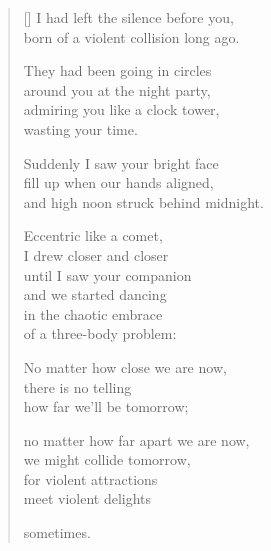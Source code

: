 \documentclass[12pt,a4paper]{article}
\begin{document}
\thispagestyle{empty}


\settowidth{\versewidth}{born of a violent collision long ago.}

\bigskip

\begin{verse}[\versewidth]
I had left the silence before you, \\
born of a violent collision long ago.

They had been going in circles \\
around you at the night party, \\
admiring you like a clock tower, \\
wasting your time.

Suddenly I saw your bright face \\
fill up when our hands aligned, \\
and high noon struck behind midnight.

Eccentric like a comet, \\
I drew closer and closer \\
until I saw your companion \\
and we started dancing \\
in the chaotic embrace \\
of a three-body problem:

No matter how close we are now, \\
there is no telling \\
how far we'll be tomorrow;

no matter how far apart we are now, \\
we might collide tomorrow, \\
for violent attractions \\
meet violent delights

sometimes.
\end{verse}
\end{document}
